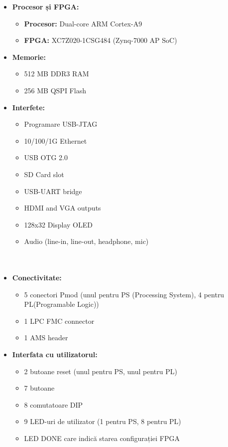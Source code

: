 \documentclass[12pt]{article}
\begin{document}
\begin{itemize}
    \item \textbf{Procesor și FPGA:}
    \begin{itemize}
        \item \textbf{Procesor:} Dual-core ARM Cortex-A9
        \item \textbf{FPGA:} XC7Z020-1CSG484 (Zynq-7000 AP SoC)
    \end{itemize}
    \item \textbf{Memorie:}
    \begin{itemize}
        \item 512 MB DDR3 RAM
        \item 256 MB QSPI Flash
    \end{itemize}
    \item \textbf{Interfete:}
    \begin{itemize}
        \item Programare USB-JTAG
        \item 10/100/1G Ethernet
        \item USB OTG 2.0
        \item SD Card slot
        \item USB-UART bridge
        \item HDMI and VGA outputs
        \item 128x32 Display OLED
        \item Audio (line-in, line-out, headphone, mic)\\\\\\
    \end{itemize}
    \item \textbf{Conectivitate:}
    \begin{itemize}
        \item 5 conectori Pmod (unul pentru PS (Processing System), 4 pentru PL(Programable Logic))
        \item 1 LPC FMC connector
        \item 1 AMS header
    \end{itemize}
    \item \textbf{Interfata cu utilizatorul:}
    \begin{itemize}
        \item 2 butoane reset (unul pentru PS, unul pentru PL)
        \item 7 butoane
        \item 8 comutatoare DIP
        \item 9 LED-uri de utilizator (1 pentru PS, 8 pentru PL)
        \item LED DONE care indică starea configurației FPGA\\
    \end{itemize}
\end{itemize}
\end{document}
